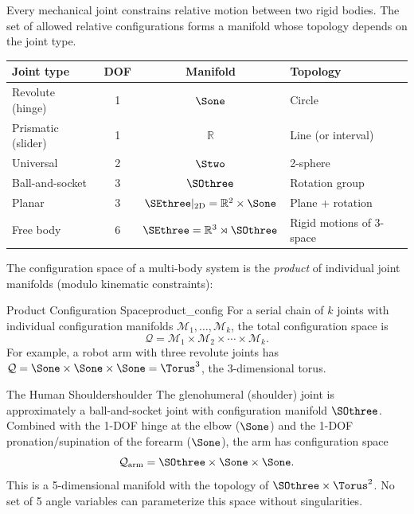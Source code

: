\documentclass[12pt, openany]{book}
\theoremstyle{plain}
\newcommand{\manifold}{\mathcal{M}}
\newcommand{\configspace}{\mathcal{Q}}
\newcommand{\Reals}{\mathbb{R}}
\begin{document}
Every mechanical joint constrains relative motion between two rigid bodies.
The set of allowed relative configurations forms a manifold whose topology
depends on the joint type.

\begin{center}
\renewcommand{\arraystretch}{1.5}
\begin{tabular}{@{} l c c l @{}}
  \toprule
  \textbf{Joint type} & \textbf{DOF} & \textbf{Manifold} & \textbf{Topology} \\
  \midrule
  Revolute (hinge) & 1 & $\Sone$ & Circle \\
  Prismatic (slider) & 1 & $\Reals$ & Line (or interval) \\
  Universal & 2 & $\Stwo$ & 2-sphere \\
  Ball-and-socket & 3 & $\SOthree$ & Rotation group \\
  Planar & 3 & $\SEthree|_{\text{2D}} = \Reals^2 \times \Sone$ & Plane + rotation \\
  Free body & 6 & $\SEthree = \Reals^3 \rtimes \SOthree$ & Rigid motions of 3-space \\
  \bottomrule
\end{tabular}
\end{center}

The configuration space of a multi-body system is the \emph{product} of
individual joint manifolds (modulo kinematic constraints):

\begin{definition}{Product Configuration Space}{product_config}
  For a serial chain of $k$ joints with individual configuration manifolds
  $\manifold_1, \ldots, \manifold_k$, the total configuration space is
  \begin{equation}\label{eq:product_config}
    \configspace = \manifold_1 \times \manifold_2 \times \cdots \times \manifold_k.
  \end{equation}
  For example, a robot arm with three revolute joints has
  $\configspace = \Sone \times \Sone \times \Sone = \Torus^3$, the
  3-dimensional torus.
\end{definition}

\begin{example}{The Human Shoulder}{shoulder}
  The glenohumeral (shoulder) joint is approximately a ball-and-socket joint
  with configuration manifold $\SOthree$. Combined with the 1-DOF hinge at
  the elbow ($\Sone$) and the 1-DOF pronation/supination of the forearm
  ($\Sone$), the arm has configuration space
  \begin{equation}
    \configspace_{\text{arm}} = \SOthree \times \Sone \times \Sone.
  \end{equation}
  This is a 5-dimensional manifold with the topology of $\SOthree \times \Torus^2$.
  No set of 5 angle variables can parameterize this space without singularities.
\end{example}
\end{document}
